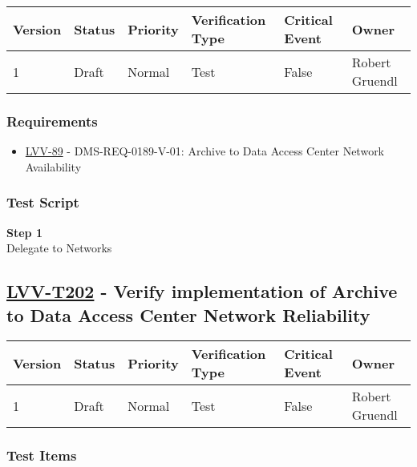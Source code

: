 \begin{longtable}[]{@{}llllll@{}}
\toprule
Version & Status & Priority & Verification Type & Critical Event &
Owner\tabularnewline
\midrule
\endhead
1 & Draft & Normal & Test & False & Robert Gruendl\tabularnewline
\bottomrule
\end{longtable}

\subsubsection{Requirements}\label{requirements-60}

\begin{itemize}
\tightlist
\item
  \href{https://jira.lsstcorp.org/browse/LVV-89}{LVV-89} -
  DMS-REQ-0189-V-01: Archive to Data Access Center Network Availability
\end{itemize}

\subsubsection{Test Script}\label{test-script-60}

\textbf{Step 1}\\
Delegate to Networks\\[2\baselineskip]

\hypertarget{lvv-t202---verify-implementation-of-archive-to-data-access-center-network-reliability}{\subsection{\texorpdfstring{\href{https://jira.lsstcorp.org/secure/Tests.jspa\#/testCase/LVV-T202}{LVV-T202}
- Verify implementation of Archive to Data Access Center Network
Reliability}{LVV-T202 - Verify implementation of Archive to Data Access Center Network Reliability}}\label{lvv-t202---verify-implementation-of-archive-to-data-access-center-network-reliability}}

\begin{longtable}[]{@{}llllll@{}}
\toprule
Version & Status & Priority & Verification Type & Critical Event &
Owner\tabularnewline
\midrule
\endhead
1 & Draft & Normal & Test & False & Robert Gruendl\tabularnewline
\bottomrule
\end{longtable}

\subsubsection{Test Items}\label{test-items-60}

